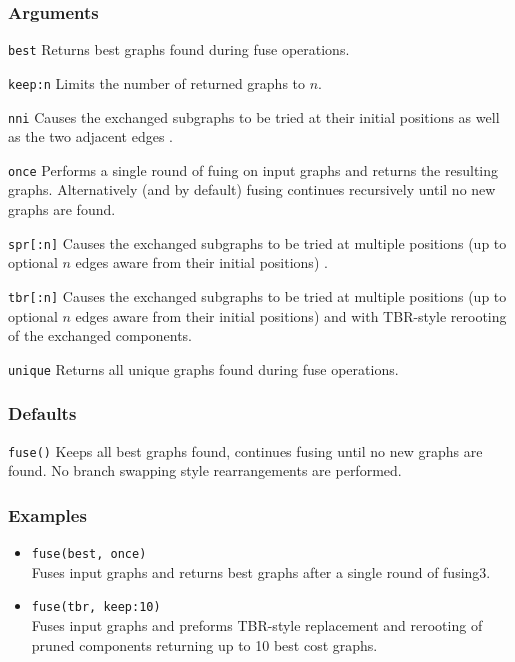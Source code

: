 \documentclass[11pt]{article}
\begin{document}
		\subsubsection{Arguments}
		\noindent \texttt{best} Returns best graphs found during fuse operations.		
		
		\smallskip		
		\noindent \texttt{keep:n} Limits the number of returned graphs to $n$.  
		
		\smallskip		
		\noindent \texttt{nni} Causes the exchanged subgraphs to be tried at their initial positions  as well as the two adjacent edges .
		
		\smallskip		
		\noindent \texttt{once} Performs a single round of fuing on input graphs and returns the resulting graphs. Alternatively (and by default) fusing continues recursively until  no new graphs are found.
		
		\smallskip		
		\noindent \texttt{spr[:n]} Causes the exchanged subgraphs to be tried at multiple positions (up to optional $n$ edges aware from their initial positions) .
		
		\smallskip		
		\noindent \texttt{tbr[:n]} Causes the exchanged subgraphs to be tried at multiple positions (up to optional $n$ edges aware from their initial positions) and with TBR-style 
		rerooting of the exchanged components.
		
		\smallskip		
		\noindent \texttt{unique} Returns all unique graphs found during fuse operations.		
	
		\subsubsection{Defaults}
			\texttt{fuse()} Keeps all best graphs found, continues fusing until no new graphs are found. No branch swapping style rearrangements are performed.
		\subsubsection{Examples}
		\begin{itemize}
			\item{\texttt{fuse(best, once)}\\Fuses input graphs and returns best graphs after a single round of fusing3.}
			\item{\texttt{fuse(tbr, keep:10)} \\Fuses input graphs and preforms TBR-style replacement and rerooting of pruned components returning up to 10 best cost graphs.}
		\end{itemize}
	
\end{document}
